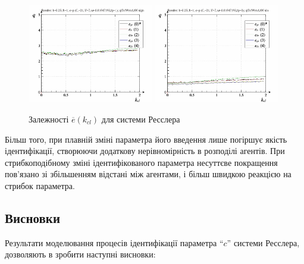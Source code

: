 \begin{figure}[ht!]
\begin{center}
  \includegraphics[width=0.49\textwidth]{p/cha/ross/ross_id-p_k_cl_ql3rlWvnAAW_sign.png}
  \hfill
  \includegraphics[width=0.49\textwidth]{p/cha/ross/ross_id-p_k_cl_ql3rlWvnAAW_sin.png}
\end{center}
\caption{Залежності $ \overline{e} (k_{cl}) $ для системи Ресслера}
\label{atu:f:ross_e_k_cl}
\end{figure}

Більш того, при плавній зміні параметра його введення
лише погіршує якість ідентифікації, створюючи додаткову
нерівномірність в розподілі агентів. При стрибкоподібному зміні
ідентифікованого параметра несуттєве покращення пов'язано зі
збільшенням відстані між агентами, і більш швидкою реакцією
на стрибок параметра.






\subsection{Висновки} %

Результати моделювання процесів ідентифікації параметра ``$c$''
системи Ресслера, дозволяють в зробити наступні висновки:

